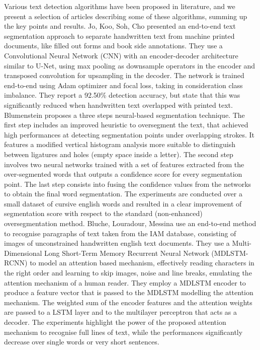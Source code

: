 Various text detection algorithms have  been proposed in literature, and we present a selection of articles describing some of these algorithms, summing up the key points and results. Jo, Koo, Soh, Cho presented an end-to-end text segmentation approach to separate handwritten text from machine printed documents, like filled out forms and book side annotations. They use a Convolutional Neural Network (CNN) with an encoder-decoder architecture similar to U-Net, using max pooling as downsample operators in the encoder and transposed convolution for upsampling in the decoder. The network is trained end-to-end using Adam optimizer and focal loss, taking in consideration class imbalance. They report a 92.50\% detection accuracy, but state that this was significantly reduced when handwritten text overlapped with printed text.
Blumenstein proposes a three steps neural-based segmentation technique. The first step includes an improved heuristic to oversegment the text, that achieved high performances at detecting segmentation points under overlapping strokes. It features a modified vertical histogram analysis more suitable to distinguish between ligatures and holes (empty space inside a letter). The second step involves two neural networks trained with a set of features extracted from the over-segmented words that outputs a confidence score for every segmentation point. The last step consists into fusing the confidence values from the networks to obtain the final word segmentation. The experiments are conducted over a small dataset of cursive english words and resulted in a clear improvement of segmentation score with respect to the standard (non-enhanced) oversegmentation method.
Bluche, Louradour, Messina use an end-to-end method to recognise paragraphs of text taken from the IAM database, consisting of images of unconstrained handwritten english text documents. They use a Multi-Dimensional Long Short-Term Memory Recurrent Neural Network (MDLSTM-RCNN) to model an attention based mechanism, effectively reading characters in the right order and learning to skip images, noise and line breaks, emulating the attention mechanism of a human reader. They employ a MDLSTM encoder to produce a feature vector that is passed to the MDLSTM modelling the attention mechanism. The weighted sum of the encoder features and the attention weights are passed to a LSTM layer and to the multilayer perceptron that acts as a decoder. The experiments highlight the power of the proposed attention mechanism to recognise full lines of text, while the performances significantly decrease over single words or very short sentences.

